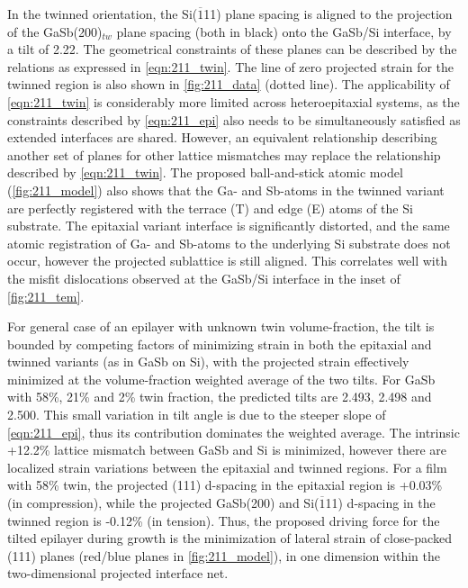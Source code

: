In the twinned orientation, the Si($\overline{1}$11) plane spacing is aligned to the projection of the GaSb(200)$_{tw}$ plane spacing (both in black) onto the GaSb/Si interface, by a tilt of 2.22\degree. The geometrical constraints of these planes can be described by the relations as expressed in \cref{eqn:211_twin}. The line of zero projected strain for the twinned region is also shown in \cref{fig:211_data} (dotted line). The applicability of \cref{eqn:211_twin} is considerably more limited across heteroepitaxial systems, as the constraints described by \cref{eqn:211_epi} also needs to be simultaneously satisfied as extended interfaces are shared. However, an equivalent relationship describing another set of planes for other lattice mismatches may replace the relationship described by \cref{eqn:211_twin}. The proposed ball-and-stick atomic model (\cref{fig:211_model}) also shows that the Ga- and Sb-atoms in the twinned variant are perfectly registered with the terrace (T) and edge (E) atoms of the Si substrate. The epitaxial variant interface is significantly distorted, and the same atomic registration of Ga- and Sb-atoms to the underlying Si substrate does not occur, however the projected sublattice is still aligned. This correlates well with the misfit dislocations observed at the GaSb/Si interface in the inset of \cref{fig:211_tem}.

For general case of an epilayer with unknown twin volume-fraction, the tilt is bounded by competing factors of minimizing strain in both the epitaxial and twinned variants (as in GaSb on Si), with the projected strain effectively minimized at the volume-fraction weighted average of the two tilts. For GaSb with 58\%, 21\% and 2\% twin fraction, the predicted tilts are 2.493\degree{}, 2.498\degree{} and 2.500\degree. This small variation in tilt angle is due to the steeper slope of \cref{eqn:211_epi}, thus its contribution dominates the weighted average. The intrinsic +12.2\% lattice mismatch between GaSb and Si is minimized, however there are localized strain variations between the epitaxial and twinned regions. For a film with 58\% twin, the projected (111) d-spacing in the epitaxial region is +0.03\% (in compression), while the projected GaSb(200) and Si($\overline{1}$11) d-spacing in the twinned region is -0.12\% (in tension). Thus, the proposed driving force for the tilted epilayer during growth is the minimization of lateral strain of close-packed (111) planes (red/blue planes in \cref{fig:211_model}), in one dimension within the two-dimensional projected interface net.

